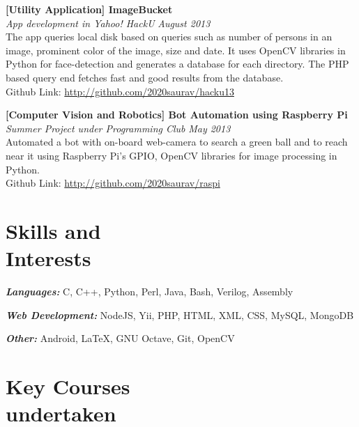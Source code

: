 \documentclass[margin,10pt]{resume}
\begin{document}
\begin{resume}
\begin{list2}
\item \textbf{[Utility Application] ImageBucket}  \\
\textsl{App development in Yahoo! HackU} \hfill \emph{August 2013}\\
The app queries local disk based on queries such as number of persons in an image, prominent color of the image, size and date. It uses OpenCV libraries in Python for face-detection and generates a database for each directory. The PHP based query end fetches fast and good results from the database.\\
Github Link: \url{http://github.com/2020saurav/hacku13}\\

\item\textbf{[Computer Vision and Robotics] Bot Automation using Raspberry Pi} \\
    \textsl{Summer Project under Programming Club} \hfill \emph{May 2013}\\
Automated a bot with on-board web-camera to search a green ball and to reach near it using Raspberry Pi's GPIO, OpenCV libraries for image processing in Python.\\
Github Link: \url{http://github.com/2020saurav/raspi}\\

\end{list2}
\section{\mysidestyle Skills and\\Interests } 
\begin{list2}
\item \emph{\textbf {Languages:}} C, C++, Python, Perl, Java, Bash, Verilog, Assembly
\item \emph{\textbf{Web Development:}} NodeJS, Yii, PHP, HTML, XML, CSS, MySQL, MongoDB
\item \emph{\textbf{Other:}} Android, \LaTeX, GNU Octave, Git, OpenCV
\end{list2}


\section{\mysidestyle Key Courses\\undertaken } 
\vspace{2mm}
\begin{table}[h]
\renewcommand{\arraystretch}{1.3}


\end{table}
\end{resume}
\end{document}
